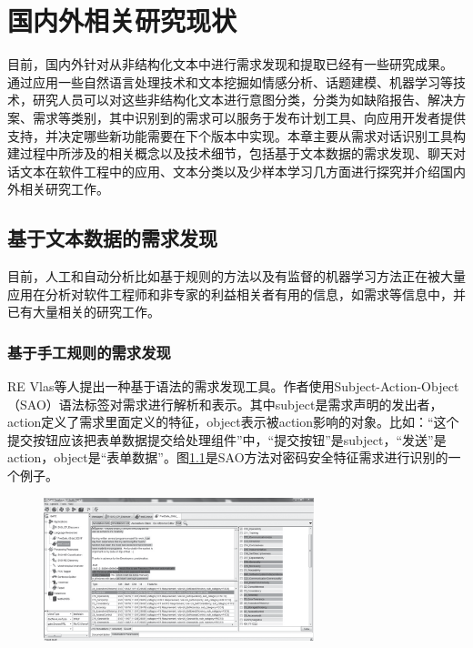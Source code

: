 \chapter{国内外相关研究现状}\label{chap:related_work}

目前，国内外针对从非结构化文本中进行需求发现和提取已经有一些研究成果。
通过应用一些自然语言处理技术和文本挖掘如情感分析、话题建模、机器学习等技术，研究人员可以对这些非结构化文本进行意图分类，分类为如缺陷报告、解决方案、需求等类别\cite{maalej2015bug}，其中识别到的需求可以服务于发布计划工具、向应用开发者提供支持，并决定哪些新功能需要在下个版本中实现。本章主要从需求对话识别工具构建过程中所涉及的相关概念以及技术细节，包括基于文本数据的需求发现、聊天对话文本在软件工程中的应用、文本分类以及少样本学习几方面进行探究并介绍国内外相关研究工作。

\section{基于文本数据的需求发现}


目前，人工和自动分析比如基于规则的方法以及有监督的机器学习方法正在被大量应用在分析对软件工程师和非专家的利益相关者有用的信息，如需求等信息中\cite{Morales2019Speech}，并已有大量相关的研究工作。
\subsection{基于手工规则的需求发现}

RE Vlas等人\cite{morales2014discovering}提出一种基于语法的需求发现工具。作者使用Subject-Action-Object（SAO）语法标签对需求进行解析和表示。其中subject是需求声明的发出者，action定义了需求里面定义的特征，object表示被action影响的对象。比如：“这个提交按钮应该把表单数据提交给处理组件”中，“提交按钮”是subject，“发送”是action，object是“表单数据”。图\ref{fig:sao}是SAO方法对密码安全特征需求进行识别的一个例子。
\begin{figure}[htbp]
    \centering
    \includegraphics[width=0.70\textwidth]{Img/sao.png}
    \label{fig:sao}
\end{figure}



